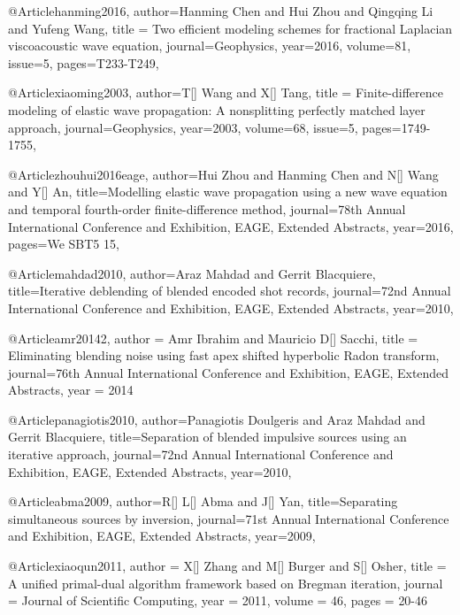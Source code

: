 {@Article{hanming2016,
  author={Hanming Chen and Hui Zhou and Qingqing Li and Yufeng Wang},
  title = {Two efficient modeling schemes for fractional Laplacian viscoacoustic wave equation},
  journal={Geophysics},
  year=2016,
  volume=81,
  issue=5,
  pages={T233-T249},
}

@Article{xiaoming2003,
  author={T[] Wang and X[] Tang},
  title = {Finite-difference modeling of elastic wave propagation: A nonsplitting perfectly matched layer approach},
  journal={Geophysics},
  year=2003,
  volume=68,
  issue=5,
  pages={1749-1755},
}

	




@Article{zhouhui2016eage,
  author={Hui Zhou and Hanming Chen and N[] Wang and Y[] An},
  title={Modelling elastic wave propagation using a new wave equation and temporal fourth-order finite-difference  method},
  journal={78th Annual International Conference and Exhibition, EAGE, Extended Abstracts},
  year=2016,
  pages={We SBT5 15},
}



@Article{mahdad2010,
  author={Araz Mahdad and Gerrit Blacquiere},
  title={Iterative deblending of blended encoded shot records},
  journal={72nd Annual International Conference and Exhibition, EAGE, Extended Abstracts},
  year=2010,
}

@Article{amr20142,
  author = 	 {Amr Ibrahim and Mauricio D[] Sacchi},
  title = 	 {Eliminating blending noise using fast apex shifted hyperbolic Radon transform},
  journal={76th Annual International Conference and Exhibition, EAGE, Extended Abstracts},
  year = 	 2014} 
  
@Article{panagiotis2010,
  author={Panagiotis Doulgeris and Araz Mahdad and Gerrit Blacquiere},
  title={Separation of blended impulsive sources using an iterative approach},
  journal={72nd Annual International Conference and Exhibition, EAGE, Extended Abstracts},
  year=2010,
}

@Article{abma2009,
  author={R[] L[] Abma and J[] Yan},
  title={Separating simultaneous sources by inversion},
  journal={71st Annual International Conference and Exhibition, EAGE, Extended Abstracts},
  year=2009,
}

@Article{xiaoqun2011,
  author = 	 {X[] Zhang and M[] Burger and S[] Osher},
  title = 	 {A unified primal-dual algorithm framework based on Bregman iteration},
  journal = 	 {Journal of Scientific Computing},
  year = 	 2011,
  volume = 	 46,
  pages = 	 {20-46}}
  
}
